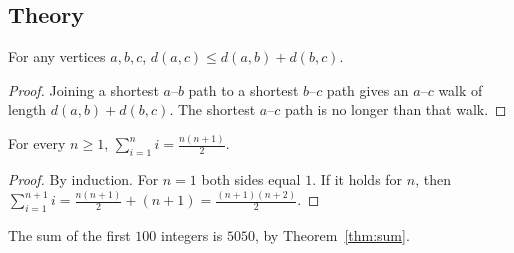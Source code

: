 \subsection{Theory}
\begin{lemma}\label{lem:tri}
For any vertices $a,b,c$, $d(a,c)\le d(a,b)+d(b,c)$.
\end{lemma}
\begin{proof}
Joining a shortest $a$--$b$ path to a shortest $b$--$c$ path gives an $a$--$c$ walk of length $d(a,b)+d(b,c)$. The shortest $a$--$c$ path is no longer than that walk.
\end{proof}
\begin{theorem}\label{thm:sum}
For every $n\ge 1$, $\displaystyle\sum_{i=1}^{n} i=\frac{n(n+1)}{2}$.
\end{theorem}
\begin{proof}
By induction. For $n=1$ both sides equal $1$. If it holds for $n$, then $\sum_{i=1}^{n+1} i=\frac{n(n+1)}{2}+(n+1)=\frac{(n+1)(n+2)}{2}$.
\end{proof}
\begin{corollary}
The sum of the first $100$ integers is $5050$, by Theorem~\ref{thm:sum}.
\end{corollary}
